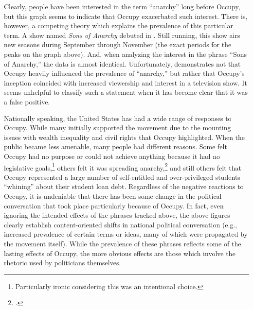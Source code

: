 \documentclass[openany,twoside]{memoir}
\begin{document}
\begin{Spacing}{2}
Clearly, people have been interested in the term ``anarchy'' long before Occupy, but this graph seems to indicate that Occupy exacerbated such interest.
There is, however, a competing theory which explains the prevalence of this particular term.
A show named \emph{Sons of Anarchy} debuted in .
Still running, this show airs new seasons during September through November (the exact periods for the peaks on the graph above).
And, when analyzing the interest in the phrase ``Sons of Anarchy,'' the data is almost identical.
Unfortunately,  demonstrates not that Occupy heavily influenced the prevalence of ``anarchy,'' but rather that Occupy's inception coincided with increased viewership and interest in a television show.
It seems unhelpful to classify such a statement when it has become clear that it was a false positive.

Nationally speaking, the United States has had a wide range of responses to Occupy.
While many initially supported the movement due to the mounting issues with wealth inequality and civil rights that Occupy highlighted.
When the public became less amenable, many people had different reasons.
Some felt Occupy had no purpose or could not achieve anything because it had no legislative goals,\footnote{
Particularly ironic considering this was an intentional choice.}
others felt it was spreading anarchy,\footcite[A misunderstanding (or irrational fear) of the roots from which Occupy drew its roots (i.e., direct democracy, not chaotic lack of organization. See][]{bray13}
and still others felt that Occupy represented a large number of self-entitled and over-privileged students ``whining'' about their student loan debt.
Regardless of the negative reactions to Occupy, it is undeniable that there has been some change in the political conversation that took place particularly because of Occupy.
In fact, even ignoring the intended effects of the phrases tracked above, the above figures clearly establish content-oriented shifts in national political conversation (e.g., increased prevalence of certain terms or ideas, many of which were propagated by the movement itself).
While the prevalence of these phrases reflects some of the lasting effects of Occupy, the more obvious effects are those which involve the rhetoric used by politicians themselves.


\end{Spacing}
\end{document}
